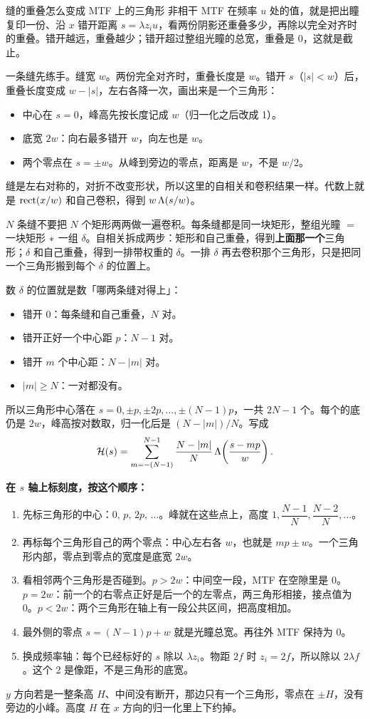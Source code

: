 \begin{recipe}[label=rcp:mtfoverlap]{缝的重叠怎么变成 MTF 上的三角形}
非相干 MTF 在频率 $u$ 处的值，就是把出瞳复印一份、沿 $x$ 错开距离 $s=\lambda z_i u$，看两份阴影还重叠多少，再除以完全对齐时的重叠。错开越远，重叠越少；错开超过整组光瞳的总宽，重叠是 0，这就是截止。

一条缝先练手。缝宽 $w$。两份完全对齐时，重叠长度是 $w$。错开 $s$（$|s|<w$）后，重叠长度变成 $w-|s|$，左右各降一次，画出来是一个三角形：
\begin{itemize}
\item 中心在 $s=0$，峰高先按长度记成 $w$（归一化之后改成 1）。
\item 底宽 $2w$：向右最多错开 $w$，向左也是 $w$。
\item 两个零点在 $s=\pm w$。从峰到旁边的零点，距离是 $w$，不是 $w/2$。
\end{itemize}
缝是左右对称的，对折不改变形状，所以这里的自相关和卷积结果一样。代数上就是 $\operatorname{rect}(x/w)$ 和自己卷积，得到 $w\,\Lambda(s/w)$。

$N$ 条缝不要把 $N$ 个矩形两两做一遍卷积。每条缝都是同一块矩形，整组光瞳 $=$ 一块矩形 $\ast$ 一组 $\delta$。自相关拆成两步：矩形和自己重叠，得到\textbf{上面那一个}三角形；$\delta$ 和自己重叠，得到一排带权重的 $\delta$。一排 $\delta$ 再去卷积那个三角形，只是把同一个三角形搬到每个 $\delta$ 的位置上。

数 $\delta$ 的位置就是数「哪两条缝对得上」：
\begin{itemize}
\item 错开 $0$：每条缝和自己重叠，$N$ 对。
\item 错开正好一个中心距 $p$：$N-1$ 对。
\item 错开 $m$ 个中心距：$N-|m|$ 对。
\item $|m|\ge N$：一对都没有。
\end{itemize}
所以三角形中心落在 $s=0,\pm p,\pm 2p,\dots,\pm(N-1)p$，一共 $2N-1$ 个。每个的底仍是 $2w$，峰高按对数取，归一化后是 $(N-|m|)/N$。写成
\[
\mathcal H(s)=\sum_{m=-(N-1)}^{N-1}\frac{N-|m|}{N}\,\Lambda\!\left(\frac{s-mp}{w}\right).
\]

\textbf{在 $s$ 轴上标刻度，按这个顺序：}
\begin{enumerate}
\item 先标三角形的中心：$0,\,p,\,2p,\,\dots$。峰就在这些点上，高度 $1,\dfrac{N-1}{N},\dfrac{N-2}{N},\dots$。
\item 再标每个三角形自己的两个零点：中心左右各 $w$，也就是 $mp\pm w$。一个三角形内部，零点到零点的宽度是底宽 $2w$。
\item 看相邻两个三角形是否碰到。$p>2w$：中间空一段，MTF 在空隙里是 0。$p=2w$：前一个的右零点正好是后一个的左零点，两三角形相接，接点值为 0。$p<2w$：两个三角形在轴上有一段公共区间，把高度相加。
\item 最外侧的零点 $s=(N-1)p+w$ 就是光瞳总宽。再往外 MTF 保持为 0。
\item 换成频率轴：每个已经标好的 $s$ 除以 $\lambda z_i$。物距 $2f$ 时 $z_i=2f$，所以除以 $2\lambda f$。这个 2 是像距，不是三角形的底宽。
\end{enumerate}
$y$ 方向若是一整条高 $H$、中间没有断开，那边只有一个三角形，零点在 $\pm H$，没有旁边的小峰。高度 $H$ 在 $x$ 方向的归一化里上下约掉。
\end{recipe}

